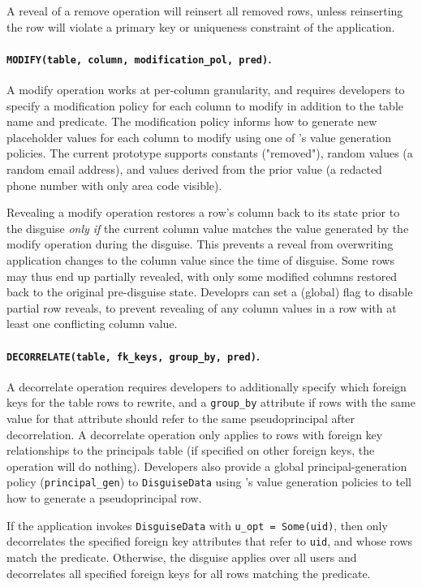 %
A reveal of a remove operation will reinsert all removed rows, unless
reinserting the row will violate a primary key or uniqueness constraint of the
application.
%

%
\paragraph{\texttt{MODIFY(table, column, modification\_pol, pred)}.}
A modify operation works at per-col\-umn granularity, and requires developers to
specify a modification policy for each column to modify in addition to the table
name and predicate.
%
The modification policy informs \sys how to generate new placeholder values for
each column to modify using one of \sys's value generation policies. The current
prototype supports constants (\eg "removed"), random values (\eg a random email
address), and values derived from the prior value (\eg a redacted phone number
with only area code visible).
%

%
Revealing a modify operation restores a row's column back to its state prior
to the disguise \emph{only if} the current column value matches the value
generated by the modify operation during the disguise. This prevents a reveal
from overwriting application changes to the column value since the time of
disguise.
%
Some rows may thus end up partially revealed, with only some modified columns
restored back to the original pre-disguise state.  Developrs can set a (global)
flag to disable partial row reveals, to prevent revealing of any column values
in a row with at least one conflicting column value.
%

%
\paragraph{\texttt{DECORRELATE(table, fk\_keys, group\_by, pred)}.}
%
A decorrelate operation requires developers to additionally specify which
foreign keys for the table rows to rewrite, and a \texttt{group\_by} attribute
if rows with the same value for that attribute should refer to the same
pseudoprincipal after decorrelation.
%
A decorrelate operation only applies to rows with foreign key relationships to
the principals table (if specified on other foreign keys, the operation will do
nothing).
%
Developers also provide a global principal-generation policy
(\texttt{principal\_gen}) to \texttt{DisguiseData} using \sys's value generation
policies to tell \sys how to generate a pseudoprincipal row.
%

%
If the application invokes \texttt{DisguiseData} with \texttt{u\_opt = Some(uid)}, then \sys only decorrelates the specified
foreign key attributes that refer to \texttt{uid}, and whose
rows match the predicate. 
%
Otherwise, the disguise applies over all users and \sys decorrelates all
specified foreign keys for all rows matching the predicate.
%

